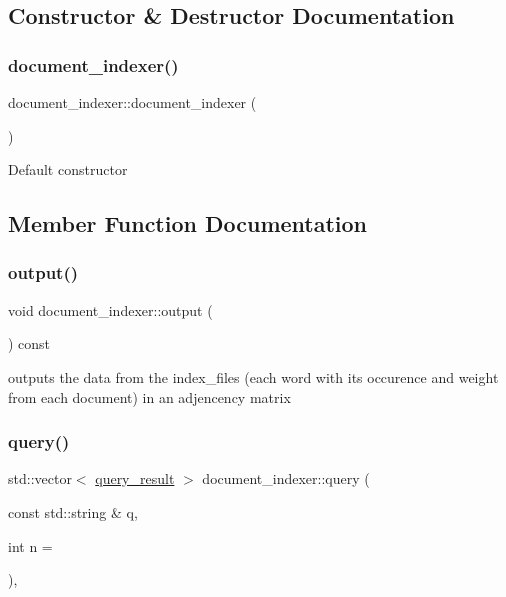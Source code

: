 \subsection{Constructor \& Destructor Documentation}
\mbox{\label{classdocument__indexer_a569b5a1dc381efce6ab2ab64644a7662}} 
\subsubsection{\texorpdfstring{document\+\_\+indexer()}{document\_indexer()}}
{\footnotesize\ttfamily document\+\_\+indexer\+::document\+\_\+indexer (\begin{DoxyParamCaption}{ }\end{DoxyParamCaption})}

Default constructor 

\subsection{Member Function Documentation}
\mbox{\label{classdocument__indexer_a1083fc1bf4418300f97c17a9d2b51820}} 
\subsubsection{\texorpdfstring{output()}{output()}}
{\footnotesize\ttfamily void document\+\_\+indexer\+::output (\begin{DoxyParamCaption}{ }\end{DoxyParamCaption}) const}

outputs the data from the index\+\_\+files (each word with its occurence and weight from each document) in an adjencency matrix \mbox{\label{classdocument__indexer_a6cb56a642b9d5cb2d3c1e0a3ef6c8a46}} 
\subsubsection{\texorpdfstring{query()}{query()}}
{\footnotesize\ttfamily std\+::vector$<$ \hyperlink{classquery__result}{query\+\_\+result} $>$ document\+\_\+indexer\+::query (\begin{DoxyParamCaption}\item[{const std\+::string \&}]{q,  }\item[{int}]{n = {} }\end{DoxyParamCaption})\hspace{0.3cm}{\ttfamily [override]}, {\ttfamily [virtual]}}

